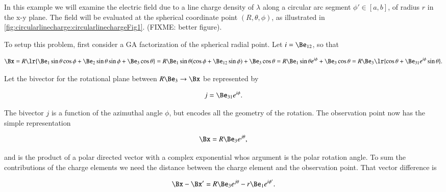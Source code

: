 %
%
In this example we will examine the electric field due to a line charge density of \( \lambda \) along a circular arc segment \( \phi' \in [a,b] \), of radius \( r \) in the x-y plane.
The field will be evaluated at the
spherical coordinate point \( (R, \theta, \phi) \), as illustrated in \cref{fig:circularlinecharge:circularlinechargeFig1}.  (FIXME: better figure).


To setup this problem, first consider a GA factorization of the spherical radial point.  Let
\( i = \Be_{12} \), so that

\begin{dmath}\label{eqn:circularlinecharge:20}
\Bx
= R \lr{ \Be_1 \sin\theta \cos\phi + \Be_2 \sin\theta \sin\phi + \Be_3 \cos\theta }
= R \Be_1 \sin\theta ( \cos\phi + \Be_{12} \sin\phi ) + \Be_3 \cos\theta
= R \Be_1 \sin\theta e^{i \phi} + \Be_3 \cos\theta
= R \Be_3 \lr{ \cos\theta + \Be_{31} e^{i \phi} \sin\theta }.
\end{dmath}

Let the bivector for the rotational plane between \( R \Be_3 \rightarrow \Bx \) be represented by

\begin{dmath}\label{eqn:circularlinecharge:40}
j = \Be_{31} e^{i \phi}.
\end{dmath}

The bivector \( j \) is a function of the azimuthal angle \( \phi \), but encodes all the geometry of the rotation.
The observation point now has the simple representation

\begin{dmath}\label{eqn:circularlinecharge:60}
\Bx = R \Be_3 e^{j \theta },
\end{dmath}

and is the product of a polar directed vector with a complex exponential whos argument is the polar rotation angle.
To sum the contributions of the charge elements we need the distance between the charge element and the observation point.  That vector difference is

\begin{dmath}\label{eqn:circularlinecharge:80}
\Bx - \Bx'
=
R \Be_3 e^{j \theta } - r \Be_1 e^{i \phi'}.
\end{dmath}

